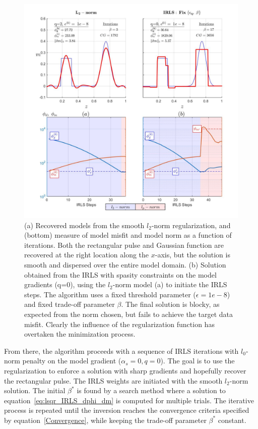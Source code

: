 \begin{figure}[p]
\includegraphics[scale=0.6]{1D_IRLS_algo1}
\caption{(a) Recovered models from the smooth $l_2$-norm regularization, and (bottom) measure of model misfit and model norm as a function of iterations. Both the rectangular pulse and Gaussian function are recovered at the right location along the $x$-axis, but the solution is smooth and dispersed over the entire model domain. (b) Solution obtained from the IRLS with spasity constraints on the model gradients ({q=0}), using the $l_2$-norm model (a) to initiate the IRLS steps. The algorithm uses a fixed threshold parameter ($\epsilon=1e-8$) and fixed trade-off parameter $\beta$. The final solution is blocky, as expected from the norm chosen, but fails to achieve the target data misfit. Clearly the influence of the regularization function has overtaken the minimization process.}
\label{fig:1D_IRLS_algo1}
\end{figure}

From there, the algorithm proceeds with a sequence of IRLS iterations with $l_0$-norm penalty on the model gradient ($\alpha_s=0, q =0$).
The goal is to use the regularization to enforce a solution with sharp gradients and hopefully recover the rectangular pulse.
The IRLS weights are initiated with the smooth $l_2$-norm solution.
The initial $\beta^*$ is found by a search method where a solution to equation~\ref{eq:lsqr_IRLS_dphi_dm} is computed for multiple trials.
The iterative process is repeated until the inversion reaches the convergence criteria specified by equation~\ref{Convergence}, while keeping the trade-off parameter $\beta^*$ constant.

